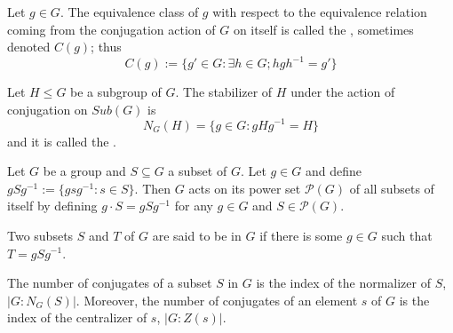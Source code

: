 \documentclass[12pt, a4paper, oneside, openright, titlepage]{book}
\begin{document}
\begin{defn}
    Let $g \in G$. The equivalence class of $g$ with respect to the equivalence relation coming from the conjugation action of $G$ on itself is called the , sometimes denoted $C(g)$; thus \begin{equation*}
        C(g) := \{g' \in G: \exists h \in G; hgh^{-1} = g' \}
    \end{equation*}
\end{defn}


\begin{defn}
    Let $H\leq G$ be a subgroup of $G$. The stabilizer of $H$ under the action of conjugation on $Sub(G)$ is \begin{equation*}
        N_G(H) = \{g \in G:gHg^{-1} = H\}
    \end{equation*}
    and it is called the .
\end{defn}


\begin{defn}
    Let $G$ be a group and $S \subseteq G$ a subset of $G$. Let $g \in G$ and define $gSg^{-1} :=\{gsg^{-1}:s \in S\}$. Then $G$ acts on its power set $\mathcal{P}(G)$ of all subsets of itself by defining $g\cdot S = gSg^{-1}$ for any $g \in G$ and $S \in \mathcal{P}(G)$. 
\end{defn}

\begin{defn}
    Two subsets $S$ and $T$ of $G$ are said to be  in $G$ if there is some $g \in G$ such that $T = gSg^{-1}$.
\end{defn}

\begin{prop}
    The number of conjugates of a subset $S$ in $G$ is the index of the normalizer of $S$, $|G:N_G(S)|$. Moreover, the number of conjugates of an element $s$ of $G$ is the index of the centralizer of $s$, $|G:Z(s)|$.
\end{prop}
\end{document}
